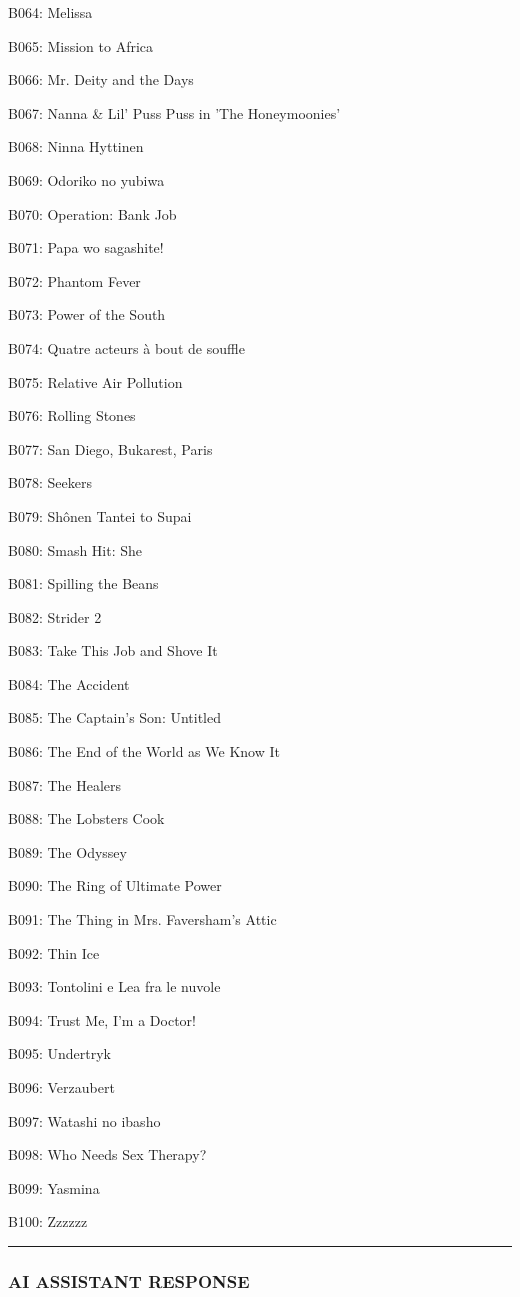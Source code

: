 \documentclass[11pt,a4paper]{article}
\begin{document}
{B064: Melissa

B065: Mission to Africa

B066: Mr. Deity and the Days

B067: Nanna \& Lil' Puss Puss in 'The Honeymoonies'

B068: Ninna Hyttinen

B069: Odoriko no yubiwa

B070: Operation: Bank Job

B071: Papa wo sagashite!

B072: Phantom Fever

B073: Power of the South

B074: Quatre acteurs à bout de souffle

B075: Relative Air Pollution

B076: Rolling Stones

B077: San Diego, Bukarest, Paris

B078: Seekers

B079: Shônen Tantei to Supai

B080: Smash Hit: She

B081: Spilling the Beans

B082: Strider 2

B083: Take This Job and Shove It

B084: The Accident

B085: The Captain's Son: Untitled

B086: The End of the World as We Know It

B087: The Healers

B088: The Lobsters Cook

B089: The Odyssey

B090: The Ring of Ultimate Power

B091: The Thing in Mrs. Faversham's Attic

B092: Thin Ice

B093: Tontolini e Lea fra le nuvole

B094: Trust Me, I'm a Doctor!

B095: Undertryk

B096: Verzaubert

B097: Watashi no ibasho

B098: Who Needs Sex Therapy?

B099: Yasmina

B100: Zzzzzz


\hrule

\subsubsection{AI ASSISTANT RESPONSE}

}
\end{document}

